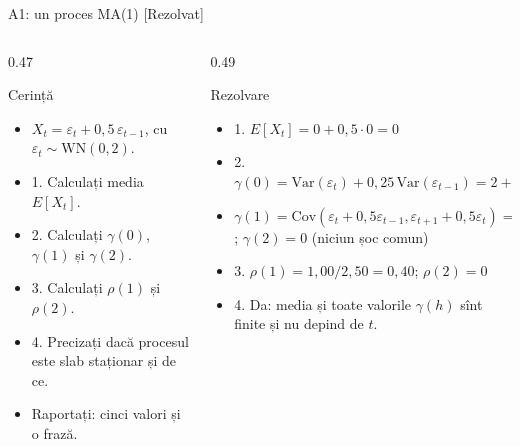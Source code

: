 \begin{frame}{A1: un proces MA(1) [Rezolvat]}
\itemsize{\scriptsize}
\begin{columns}[T]
\begin{column}{0.47\textwidth}
\begin{block}{Cerință}
\begin{itemize}
    \item $X_t = \varepsilon_t + 0{,}5\,\varepsilon_{t-1}$, cu $\varepsilon_t \sim \mathrm{WN}(0, 2)$.
    \item 1. Calculați media $E[X_t]$.
    \item 2. Calculați $\gamma(0)$, $\gamma(1)$ și $\gamma(2)$.
    \item 3. Calculați $\rho(1)$ și $\rho(2)$.
    \item 4. Precizați dacă procesul este slab staționar și de ce.
    \item Raportați: cinci valori și o frază.
\end{itemize}
\end{block}
\end{column}
\begin{column}{0.49\textwidth}
\begin{exampleblock}{Rezolvare}
\begin{itemize}
    \item 1. $E[X_t] = 0 + 0{,}5 \cdot 0 = 0$
    \item 2. $\gamma(0) = \mathrm{Var}(\varepsilon_t) + 0{,}25\,\mathrm{Var}(\varepsilon_{t-1}) = 2 + 0{,}5 = 2{,}50$
    \item $\gamma(1) = \mathrm{Cov}(\varepsilon_t + 0{,}5\varepsilon_{t-1}, \varepsilon_{t+1} + 0{,}5\varepsilon_t) = 0{,}5 \cdot 2 = 1{,}00$; $\gamma(2) = 0$ (niciun șoc comun)
    \item 3. $\rho(1) = 1{,}00/2{,}50 = 0{,}40$; $\rho(2) = 0$
    \item 4. Da: media și toate valorile $\gamma(h)$ sînt finite și nu depind de $t$.
\end{itemize}
\end{exampleblock}
\end{column}
\end{columns}
\end{frame}

